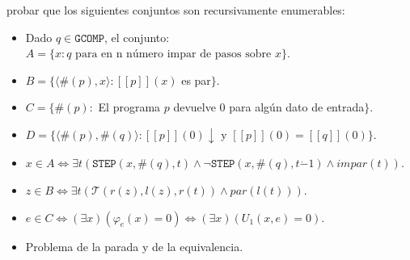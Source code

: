 \documentclass[twoside]{article}
\begin{document}
\begin{ejercicio}{14}
probar que los siguientes conjuntos son recursivamente enumerables:
\begin{itemize}
	\item Dado $q \in \texttt{GCOMP}$, el conjunto: $A = \{ x : q \text{ para en n número impar de pasos sobre }x\}$.
	\item $B = \{\langle \#(p),x\rangle : [[p]](x)$ es par$\}$.
	\item $C = \{\#(p) : $ El programa $p$ devuelve $0$ para algún dato de entrada$\}$.
	\item $D = \{\langle\#(p),\#(q)\rangle : [[p]](0)\downarrow $ y $[[p]](0)=[[q]](0)\}$.
\end{itemize}
\end{ejercicio}
\begin{solucion}\mbox{}
\begin{itemize}
	\item $x\in A\Leftrightarrow \exists t (\texttt{STEP}(x, \#(q),t)\land \neg\texttt{STEP}(x, \#(q),t\dot{-}1)\land impar(t))$.
	\item $z\in B\Leftrightarrow \exists t (\mathcal{T}(r(z),l(z),r(t))\land par(l(t)))$.
	\item $e \in C \Leftrightarrow (\exists x) (φ_e(x) = 0) \Leftrightarrow (\exists x)(U_1(x,e) = 0)$.
	\item Problema de la parada y de la equivalencia.
\end{itemize}
\end{solucion}

\newpage
\end{document}
